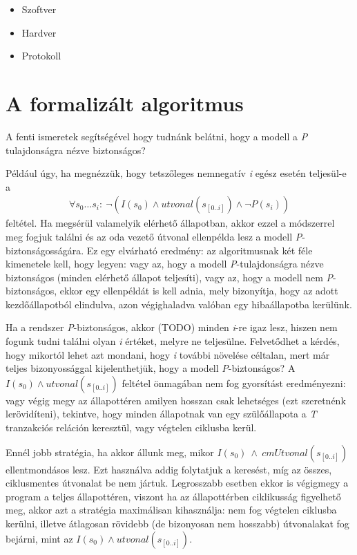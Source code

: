 \begin{itemize}
	\item Szoftver
	
	\item Hardver
	
	\item Protokoll
\end{itemize}

\section{A formalizált algoritmus}
\label{sec:formalizalt_alg}

A fenti ismeretek segítségével hogy tudnánk belátni, hogy a modell a \emph{P} tulajdonságra nézve biztonságos?

Például úgy, ha megnézzük, hogy tetszőleges nemnegatív \emph{i} egész esetén teljesül-e a
\begin{align}
	\forall s_{0} \dots s_{i}:~\neg(I(s_{0}) \wedge utvonal(s_{[0..i]}) \wedge \neg P(s_{i}))
\end{align}
feltétel. Ha megsérül valamelyik elérhető állapotban, akkor ezzel a módszerrel meg fogjuk találni és az oda vezető útvonal ellenpélda lesz a modell \emph{P}-biztonságosságára. Ez egy elvárható eredmény: az algoritmusnak két féle kimenetele kell, hogy legyen: vagy az, hogy a modell \emph{P}-tulajdonságra nézve biztonságos (minden elérhető állapot teljesíti), vagy az, hogy a modell nem \emph{P}-biztonságos, ekkor egy ellenpéldát is kell adnia, mely bizonyítja, hogy az adott kezdőállapotból elindulva, azon végighaladva valóban egy hibaállapotba kerülünk.

Ha a rendszer \emph{P}-biztonságos, akkor (TODO) minden \emph{i}-re igaz lesz, hiszen nem fogunk tudni találni olyan \emph{i} értéket, melyre ne teljesülne. Felvetődhet a kérdés, hogy mikortól lehet azt mondani, hogy \emph{i} további növelése céltalan, mert már teljes bizonyossággal kijelenthetjük, hogy a modell \emph{P}-biztonságos? A $I(s_{0}) \wedge utvonal(s_{[0..i]})$ feltétel önmagában nem fog gyorsítást eredményezni: vagy végig megy az állapottéren amilyen hosszan csak lehetséges (ezt szeretnénk lerövidíteni), tekintve, hogy minden állapotnak van egy szülőállapota a \emph{T} tranzakciós reláción keresztül, vagy végtelen ciklusba kerül.

Ennél jobb stratégia, ha akkor állunk meg, mikor $I(s_{0})~\wedge~ cmUtvonal(s_{[0..i]})$ ellentmondásos lesz. Ezt használva addig folytatjuk a keresést, míg az összes, ciklusmentes útvonalat be nem jártuk. Legrosszabb esetben ekkor is végigmegy a program a teljes állapottéren, viszont ha az állapottérben ciklikusság figyelhető meg, akkor azt a stratégia maximálisan kihasználja: nem fog végtelen ciklusba kerülni, illetve átlagosan rövidebb (de bizonyosan nem hosszabb) útvonalakat fog bejárni, mint az $I(s_{0}) \wedge utvonal(s_{[0..i]})$.

